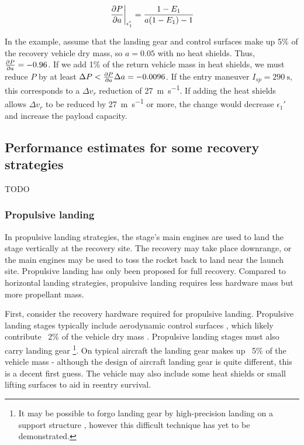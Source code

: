 \documentclass[conf]{new-aiaa}
\begin{document}
\begin{equation}
\left. \pdv{P}{a} \right|_{\epsilon_1'} = \frac{1 - E_1}{a(1 -E_1) - 1}
\end{equation}

In the example, assume that the landing gear and control surfaces make up 5\% of the recovery vehicle dry mass, so $a=0.05$ with no heat shields. Thus, $ \pdv{P}{a} = -0.96$. If we add 1\% of the return vehicle mass in heat shields, we must reduce $P$ by at least $\Delta P < \pdv{P}{a} \Delta a = -0.0096$. If the entry maneuver $I_{sp} = \SI{290}{\second}$, this corresponds to a $\Delta v_r$ reduction of \SI{27}{\meter\per\second}. If adding the heat shields allows $\Delta v_r$ to be reduced by \SI{27}{\meter\per\second} or more, the change would decrease $\epsilon_1'$ and increase the payload capacity.


\subsection{Performance estimates for some recovery strategies}
TODO

\subsubsection{Propulsive landing}
In propulsive landing strategies, the stage's main engines are used to land the stage vertically at the recovery site. The recovery may take place downrange, or the main engines may be used to toss the rocket back to land near the launch site. Propulsive landing has only been proposed for full recovery. Compared to horizontal landing strategies, propulsive landing requires less hardware mass but more propellant mass.

First, consider the recovery hardware required for propulsive landing. Propulsive landing stages typically include aerodynamic control surfaces \cite{NewGlenn, Falcon9, DCX, Musk2017}, which likely contribute ~2\% of the vehicle dry mass \cite{Sforza2015}. Propulsive landing stages must also carry landing gear \footnote{It may be possible to forgo landing gear by high-precision landing on a support structure \cite{Musk2017}, however this difficult technique has yet to be demonstrated.}. On typical aircraft the landing gear makes up ~5\% of the vehicle mass \cite{Sforza2015} - although the design of aircraft landing gear is quite different, this is a decent first guess. The vehicle may also include some heat shields or small lifting surfaces to aid in reentry survival.
\end{document}
